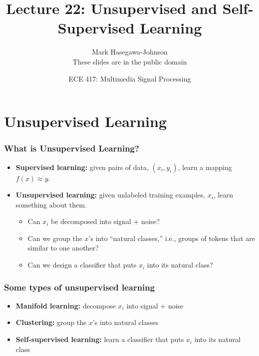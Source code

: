 \documentclass{beamer}
\title{Lecture 22: Unsupervised and Self-Supervised Learning}
\author{Mark Hasegawa-Johnson\\These slides are in the public domain}
\date{ECE 417: Multimedia Signal Processing}
\institute{University of Illinois}
\begin{document}
\begin{frame}
  \maketitle
\end{frame}

\begin{frame}
  \tableofcontents
\end{frame}

\section[Overview]{Unsupervised Learning}
\setcounter{subsection}{1}

\begin{frame}
  \frametitle{What is Unsupervised Learning?}

  \begin{itemize}
  \item {\bf Supervised learning:} given pairs of data, $(x_i,y_i)$,
    learn a mapping $f(x)\approx y$.
  \item {\bf Unsupervised learning:} given unlabeled training
    examples, $x_i$, learn something about them.
    \begin{itemize}
    \item Can $x_i$ be decomposed into signal + noise?
    \item Can we group the $x$'s into ``natural classes,'' i.e.,
      groups of tokens that are similar to one another?
    \item Can we design a classifier that puts $x_i$ into its natural
      class?
    \end{itemize}
  \end{itemize}
\end{frame}

\begin{frame}
  \frametitle{Some types of unsupervised learning}

  \begin{itemize}
  \item {\bf Manifold learning:} decompose $x_i$ into signal + noise
  \item {\bf Clustering:} group the $x$'s into natural classes
  \item {\bf Self-supervised learning:} learn a classifier that
    puts $x_i$ into its natural class
  \end{itemize}
\end{frame}
\end{document}
